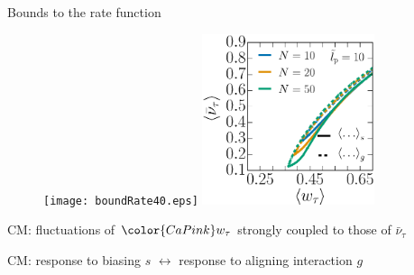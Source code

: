 \documentclass{beamer}
\begin{document}
\begin{frame}{Bounds to the rate function}


\begin{figure}
\texttt{[image: boundRate40.eps]}
\includegraphics[height=5cm]{nuW_Lm1000.eps}
\end{figure}

\pause
\begin{center}
CM: fluctuations of ${\color{CaPink} w_{\tau}}$ strongly coupled to those of $\bar{\nu}_{\tau}$
\end{center}

\pause
\begin{center}
CM: response to biasing $s$ $\leftrightarrow$ response to aligning interaction $g$
\end{center}

\end{frame}
\end{document}
